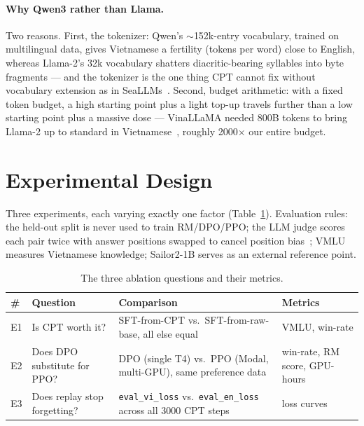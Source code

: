 \documentclass[10pt,twocolumn]{article}
\begin{document}
\paragraph{Why Qwen3 rather than Llama.}
Two reasons. First, the tokenizer: Qwen's $\sim$152k-entry vocabulary, trained on multilingual data, gives Vietnamese a fertility (tokens per word) close to English, whereas Llama-2's 32k vocabulary shatters diacritic-bearing syllables into byte fragments --- and the tokenizer is the one thing CPT cannot fix without vocabulary extension as in SeaLLMs~\citep{nguyen2023seallms}. Second, budget arithmetic: with a fixed token budget, a high starting point plus a light top-up travels further than a low starting point plus a massive dose --- VinaLLaMA needed 800B tokens to bring Llama-2 up to standard in Vietnamese~\citep{nguyen2023vinallama}, roughly 2000$\times$ our entire budget.

\section{Experimental Design}
\label{sec:experiments}

Three experiments, each varying exactly one factor (Table~\ref{tab:ablations}). Evaluation rules: the held-out split is never used to train RM/DPO/PPO; the LLM judge scores each pair twice with answer positions swapped to cancel position bias~\citep{zheng2023judge}; VMLU~\citep{vmlu2025} measures Vietnamese knowledge; Sailor2-1B serves as an external reference point.

\begin{table}[t]
\centering\small
\caption{The three ablation questions and their metrics.}
\label{tab:ablations}
\begin{tabularx}{\textwidth}{@{}lXXl@{}}
\toprule
\# & \textbf{Question} & \textbf{Comparison} & \textbf{Metrics} \\
\midrule
E1 & Is CPT worth it? & SFT-from-CPT vs.\ SFT-from-raw-base, all else equal & VMLU, win-rate \\
E2 & Does DPO substitute for PPO? & DPO (single T4) vs.\ PPO (Modal, multi-GPU), same preference data & win-rate, RM score, GPU-hours \\
E3 & Does replay stop forgetting? & \texttt{eval\_vi\_loss} vs.\ \texttt{eval\_en\_loss} across all 3000 CPT steps & loss curves \\
\bottomrule
\end{tabularx}
\end{table}
\end{document}
